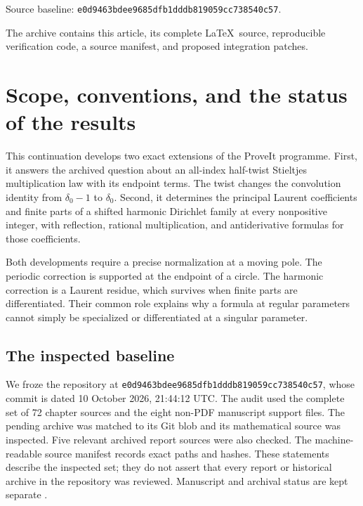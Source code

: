 \documentclass[11pt,letterpaper]{article}
\numberwithin{equation}{section}
\theoremstyle{plain}
\theoremstyle{definition}
\theoremstyle{remark}
\newcommand{\pinned}{\texttt{e0d9463bdee9685dfb1dddb819059cc738540c57}}
\begin{document}
\begin{titlepage}
\begin{abstract}
For self-contained proofs and consistent normalizations we consolidate
the untwisted periodic Stieltjes algebra and polylogarithm kernels
already developed in archived repository continuations, crediting those
results and their classical antecedents. The package includes exact
symbolic checks, independent numerical diagnostics, a source audit,
two proposed manuscript corrections, and further research questions.
No universal priority claim is made; the remaining \(S_6\) and newer
\(S_8\) special-value conjectures remain unresolved.
\end{abstract}
\vfill
\noindent\small
Source baseline: \pinned.\par
The archive contains this article, its complete \LaTeX\ source,
reproducible verification code, a source manifest, and proposed
integration patches.
\end{titlepage}
\tableofcontents
\clearpage

\section{Scope, conventions, and the status of the results}
\label{scope:sec}

This continuation develops two exact extensions of the ProveIt programme.
First, it answers the archived question about an all-index half-twist
Stieltjes multiplication law with its endpoint terms. The twist changes
the convolution identity from \(\delta_0-1\) to \(\delta_0\).
Second, it determines the principal Laurent coefficients and finite
parts of a shifted harmonic Dirichlet family at every nonpositive
integer, with reflection, rational multiplication, and antiderivative
formulas for those coefficients.

Both developments require a precise normalization at a moving pole.
The periodic correction is supported at the endpoint of a circle.
The harmonic correction is a Laurent residue, which survives when
finite parts are differentiated. Their common role explains why a
formula at regular parameters cannot simply be specialized or
differentiated at a singular parameter.

\subsection{The inspected baseline}

We froze the repository at \pinned, whose commit is dated
10 October 2026, 21:44:12 UTC. The audit used the complete set of
72 chapter sources and the eight non-PDF manuscript support files.
The pending archive
was matched to its Git blob and its mathematical source was inspected.
Five relevant archived report sources were also checked.
The machine-readable source manifest records exact paths and hashes.
These statements describe the inspected set; they do not assert that
every report or historical archive in the repository was reviewed.
Manuscript and archival status are kept separate
\cite{RepoManuscript,RepoIncoming}.
\end{document}
